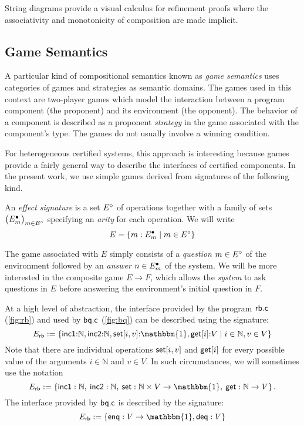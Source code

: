 \documentclass[sigplan,10pt,authordraft]{acmart}
\begin{document}
String diagrams
provide a visual calculus for refinement proofs where
the associativity and monotonicity of composition
are made implicit.


\subsection{Game Semantics} %

A particular kind of compositional semantics
known as \emph{game semantics} uses
categories of games and strategies
as semantic domains.
The games used in this context are
two-player games
which model the interaction between
a program component (the proponent)
and its environment (the opponent).
The behavior of a component
is described as a proponent \emph{strategy}
in the game associated with the component's type.
The games do not usually involve
a winning condition. %

For heterogeneous certified systems,
this approach is interesting
because games provide a fairly general way to describe
the interfaces of certified components.
In the present work,
we use simple games
derived from signatures of the following kind.

\begin{definition}
An \emph{effect signature} is a set $E^\circ$ of operations
together with a family of sets $\big( E^\bullet_m \big)_{m \in E^\circ}$
specifying an \emph{arity} for each operation.
We will write
\[
  E = \{ m : E^\bullet_m \mid m \in E^\circ \}
\]
\end{definition}

The game associated with $E$ simply consists of
a \emph{question} $m \in E^\circ$ of the environment
followed by an \emph{answer} $n \in E^\bullet_m$ of the system.
We will be more interested in the composite game $E \rightarrow F$,
which allows the \emph{system} to ask questions in $E$
before answering the environment's initial question in $F$.

At a high level of abstraction,
the interface provided by the program $ \mathsf{rb.c} $ (\autoref{fig:rb})
and used by $ \mathsf{bq.c} $ (\autoref{fig:bq})
can be described using the signature:
\[
  E_\kw{rb} := \{
    \kw{inc1} {:} \mathbb{N},
    \kw{inc2} {:} \mathbb{N},
    \kw{set}[i, v] {:} \mathbbm{1},
    \kw{get}[i] {:} V \mid
    i \in \mathbb{N}, v \in V \}
\]
Note that there are individual operations
$ \mathsf{set} [i, v]$ and $ \mathsf{get} [i]$
for every possible value of the arguments
$i \in \mathbb{N}$ and $v \in V$.
In such circumstances,
we will sometimes use the notation
\[
  E_\kw{rb} := \{
    \kw{inc1} : \mathbb{N}, \:
    \kw{inc2} : \mathbb{N}, \:
    \kw{set} : \mathbb{N} \times V \rightarrow \mathbbm{1}, \:
    \kw{get} : \mathbb{N} \rightarrow V \}
  \,.
\]
The interface provided by $ \mathsf{bq.c} $
is described by the signature:
\[
  E_\kw{rb} := \{
    \kw{enq} : V \rightarrow \mathbbm{1},
    \kw{deq} : V \}
\]
\end{document}
